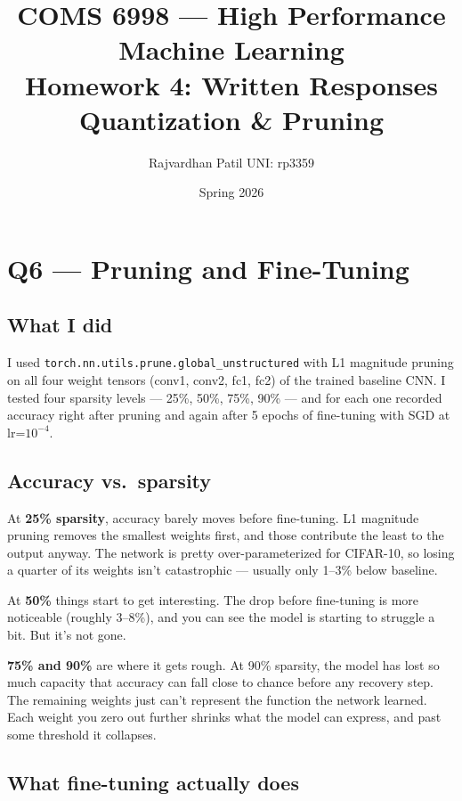 \documentclass[11pt]{article}
\title{\textbf{COMS 6998 --- High Performance Machine Learning}\\[4pt]
       Homework 4: Written Responses\\[2pt]
       \large Quantization \& Pruning}
\author{Rajvardhan Patil \quad UNI: rp3359}
\date{Spring 2026}
\begin{document}
\maketitle
\tableofcontents
\newpage

\section{Q6 --- Pruning and Fine-Tuning}

\subsection{What I did}

I used \texttt{torch.nn.utils.prune.global\_unstructured} with L1 magnitude pruning on all four weight tensors (conv1, conv2, fc1, fc2) of the trained baseline CNN. I tested four sparsity levels --- 25\%, 50\%, 75\%, 90\% --- and for each one recorded accuracy right after pruning and again after 5 epochs of fine-tuning with SGD at lr=$10^{-4}$.

\subsection{Accuracy vs.\ sparsity}

At \textbf{25\% sparsity}, accuracy barely moves before fine-tuning. L1 magnitude pruning removes the smallest weights first, and those contribute the least to the output anyway. The network is pretty over-parameterized for CIFAR-10, so losing a quarter of its weights isn't catastrophic --- usually only 1--3\% below baseline.

At \textbf{50\%} things start to get interesting. The drop before fine-tuning is more noticeable (roughly 3--8\%), and you can see the model is starting to struggle a bit. But it's not gone.

\textbf{75\% and 90\%} are where it gets rough. At 90\% sparsity, the model has lost so much capacity that accuracy can fall close to chance before any recovery step. The remaining weights just can't represent the function the network learned. Each weight you zero out further shrinks what the model can express, and past some threshold it collapses.

\subsection{What fine-tuning actually does}
\end{document}
